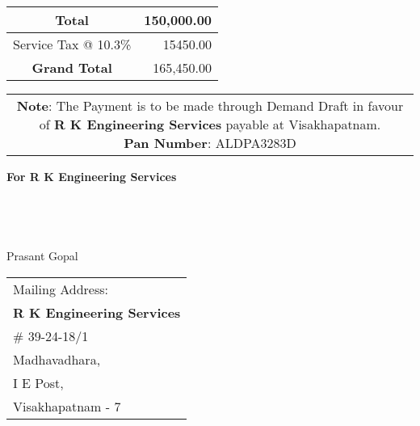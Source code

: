 \documentclass[11pt]{article}
\begin{document}
\vspace*{0.5cm}

\hspace*{11.5cm}
\begin{tabular}{|c|r|}
\hline
Total & 150,000.00 \\
\hline
Service Tax @ 10.3\% & 15450.00 \\
\hline
{\bf Grand Total} & 165,450.00 \\
\hline
\end{tabular}

\vspace*{-1 cm}
\noindent \begin{tabular}{c}
\noindent \parbox{4in}{ {\bf Note}: The Payment is to be made through Demand Draft in favour of {\bf R K Engineering Services} payable at Visakhapatnam. \\
{\noindent \bf Pan Number}:  ALDPA3283D }\\
\end{tabular}
\vspace*{75pt}


{\bf For  R K Engineering Services } \\ \\ \\ \\ \\
 \hspace*{0.6cm}Prasant Gopal
\vspace*{-71pt}
\begin{flushright}
\begin{tabular}{l}
Mailing Address:\\
{\bf R K Engineering Services}\\
\# 39-24-18/1\\
Madhavadhara, \\ 
I E Post, \\
Visakhapatnam - 7\\
\end{tabular}
\end{flushright}
\end{document}
